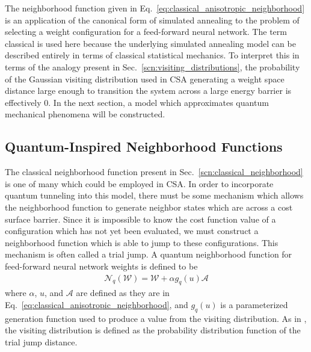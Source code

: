 \documentclass[11pt]{afthesis}
\begin{document}
	The neighborhood function given in Eq.~\ref{eq:classical_anisotropic_neighborhood} is an application of the canonical form of simulated annealing to the problem of selecting a weight configuration for a feed-forward neural network. The term classical is used here because the underlying simulated annealing model can be described entirely in terms of classical statistical mechanics. To interpret this in terms of the analogy present in Sec.~\ref{scn:visiting_distributions}, the probability of the Gaussian visiting distribution used in CSA generating a weight space distance large enough to transition the system across a large energy barrier is effectively $0$. In the next section, a model which approximates quantum mechanical phenomena will be constructed.
	
	\subsection{Quantum-Inspired Neighborhood Functions}
	\label{scn:quantum_neighborhood}
	
	The classical neighborhood function present in Sec.~\ref{scn:classical_neighborhood} is one of many which could be employed in CSA. In order to incorporate quantum tunneling into this model, there must be some mechanism which allows the neighborhood function to generate neighbor states which are across a cost surface barrier. Since it is impossible to know the cost function value of a configuration which has not yet been evaluated, we must construct a neighborhood function which is able to jump to these configurations. This mechanism is often called a trial jump. A quantum neighborhood function for feed-forward neural network weights is defined to be
	\begin{align}\label{eq:quantum_anisotropic_neighborhood}
	\mathcal{N}_{q} (\boldsymbol{\mathcal{W}}) = \boldsymbol{\mathcal{W}} + \alpha g_{q}(u) \boldsymbol{\mathcal{A}} 
	\end{align}
	\noindent where $\alpha$, $u$, and $\boldsymbol{\mathcal{A}}$ are defined as they are in Eq.~\ref{eq:classical_anisotropic_neighborhood}, and $g_{q}(u)$ is a parameterized generation function used to produce a value from the visiting distribution. As in \cite{tsallis1996generalizedsimulatedannealing}, the visiting distribution is defined as the probability distribution function of the trial jump distance. 
	
\end{document}

